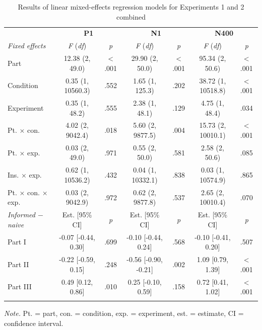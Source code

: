 \documentclass[
  english,
  man,11pt,floatsintext]{apa7}
\begin{document}
\begin{table}[tbp]

\begin{center}
\begin{threeparttable}

\caption{\label{tab:joint-table}Results of linear mixed-effects regression models for Experiments 1 and 2 combined}

\footnotesize{

\begin{tabular}{lcccccc}
\toprule
 & \multicolumn{2}{c}{\textbf{P1}} & \multicolumn{2}{c}{\textbf{N1}} & \multicolumn{2}{c}{\textbf{N400}} \\
\cmidrule(r){2-3} \cmidrule(r){4-5} \cmidrule(r){6-7}
\textit{Fixed effects} & \textit{F} (\textit{df}) & \textit{p} & \textit{F} (\textit{df}) & \textit{p} & \textit{F} (\textit{df}) & \textit{p}\\
\midrule
Part & 12.38 (2, 49.0) & < .001 & 29.90 (2, 50.0) & < .001 & 95.34 (2, 50.6) & < .001\\
Condition & 0.35 (1, 10560.3) & .552 & 1.65 (1, 125.3) & .202 & 38.72 (1, 10518.8) & < .001\\
Experiment & 0.35 (1, 48.2) & .555 & 2.38 (1, 48.1) & .129 & 4.75 (1, 48.4) & .034\\
Pt. × con. & 4.02 (2, 9042.4) & .018 & 5.60 (2, 9877.5) & .004 & 15.73 (2, 10010.1) & < .001\\
Pt. × exp. & 0.03 (2, 49.0) & .971 & 0.55 (2, 50.0) & .581 & 2.58 (2, 50.6) & .085\\
Ins. × exp. & 0.62 (1, 10536.2) & .432 & 0.04 (1, 10332.1) & .838 & 0.03 (1, 10574.9) & .865\\
Pt. × con. × exp. & 0.03 (2, 9042.9) & .972 & 0.62 (2, 9877.8) & .537 & 2.65 (2, 10010.4) & .070\\
\textit{Informed $-$  naive} & Est. [95\% CI] & \textit{p} & Est. [95\% CI] & \textit{p} & Est. [95\% CI] & \textit{p}\\ \midrule
Part I & -0.07 [-0.44, 0.30] & .699 & -0.10 [-0.44, 0.24] & .568 & -0.10 [-0.41, 0.20] & .507\\
Part II & -0.22 [-0.59, 0.15] & .248 & -0.56 [-0.90, -0.21] & .002 & 1.09 [0.79, 1.39] & < .001\\
Part III & 0.49 [0.12, 0.86] & .010 & 0.25 [-0.10, 0.59] & .158 & 0.72 [0.41, 1.02] & < .001\\
\bottomrule
\addlinespace
\end{tabular}

}

\begin{tablenotes}[para]
\normalsize{\textit{Note.} Pt. = part, con. = condition, exp. = experiment, est. = estimate, CI = confidence interval.}
\end{tablenotes}

\end{threeparttable}
\end{center}

\end{table}
\end{document}
